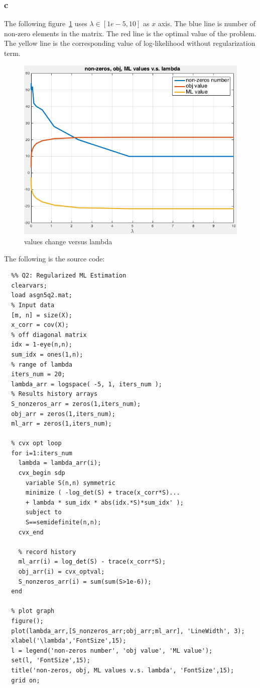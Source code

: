 \message{ !name(ass5_ChangLi.tex)}\documentclass[10pt,a4paper]{article}
\begin{document}
\subsubsection{c}
The following figure~\ref{fig:q2vs} uses $\lambda\in [1e-5,10]$ as $x$
axis. The blue line is number of non-zero elements in the
matrix. The red line is the optimal value of the problem.
The yellow line is the corresponding value of log-likelihood
without regularization term.
\begin{figure}
  \centering
	\includegraphics[width=0.7\linewidth]{Q2_vslambda.png}
  \caption{values change versus lambda}
  \label{fig:q2vs}
\end{figure}

The following is the source code:

\begin{lstlisting}
  %% Q2: Regularized ML Estimation
  clearvars;
  load asgn5q2.mat;
  % Input data
  [m, n] = size(X);
  x_corr = cov(X);
  % off diagonal matrix
  idx = 1-eye(n,n);
  sum_idx = ones(1,n);
  % range of lambda
  iters_num = 20;
  lambda_arr = logspace( -5, 1, iters_num );
  % Results history arrays
  S_nonzeros_arr = zeros(1,iters_num);
  obj_arr = zeros(1,iters_num);
  ml_arr = zeros(1,iters_num);

  % cvx opt loop
  for i=1:iters_num
    lambda = lambda_arr(i);
    cvx_begin sdp
      variable S(n,n) symmetric 
      minimize ( -log_det(S) + trace(x_corr*S)...
      + lambda * sum_idx * abs(idx.*S)*sum_idx' );
      subject to
      S==semidefinite(n,n);
    cvx_end

    % record history
    ml_arr(i) = log_det(S) - trace(x_corr*S);
    obj_arr(i) = cvx_optval;
    S_nonzeros_arr(i) = sum(sum(S>1e-6));
  end

  % plot graph
  figure();
  plot(lambda_arr,[S_nonzeros_arr;obj_arr;ml_arr], 'LineWidth', 3);
  xlabel('\lambda','FontSize',15);
  l = legend('non-zeros number', 'obj value', 'ML value');
  set(l, 'FontSize',15);
  title('non-zeros, obj, ML values v.s. lambda', 'FontSize',15);
  grid on;
\end{lstlisting}
\end{document}
